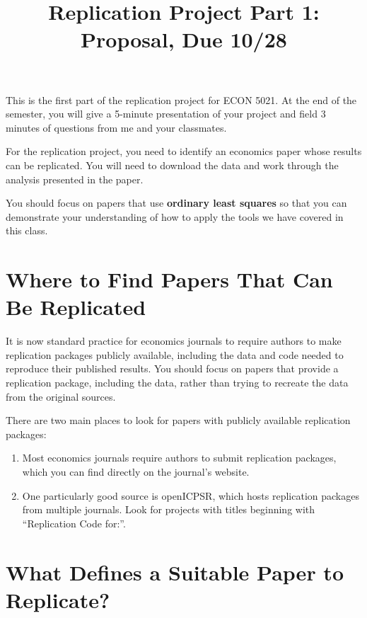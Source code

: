 \documentclass[11pt]{article}
\title{Replication Project Part 1: Proposal, Due 10/28}
\date{}
\author{}
\begin{document}
\vspace*{-4em}
{\let\newpage\relax\maketitle}
\vspace*{-3em}

This is the first part of the replication project for ECON 5021. At the end of the semester, you will give a 5-minute presentation of your project and field 3 minutes of questions from me and your classmates.

For the replication project, you need to identify an economics paper whose results can be replicated. You will need to download the data and work through the analysis presented in the paper.

You should focus on papers that use \textbf{ordinary least squares} so that you can demonstrate your understanding of how to apply the tools we have covered in this class.

\section*{Where to Find Papers That Can Be Replicated}

It is now standard practice for economics journals to require authors to make replication packages publicly available, including the data and code needed to reproduce their published results. You should focus on papers that provide a replication package, including the data, rather than trying to recreate the data from the original sources.

There are two main places to look for papers with publicly available replication packages:
\begin{enumerate}
\item Most economics journals require authors to submit replication packages, which you can find directly on the journal's website.
\item One particularly good source is openICPSR, which hosts replication packages from multiple journals. Look for projects with titles beginning with ``Replication Code for:''.
\end{enumerate}

\section*{What Defines a Suitable Paper to Replicate?}
\end{document}
